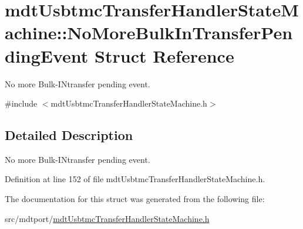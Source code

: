 \hypertarget{structmdt_usbtmc_transfer_handler_state_machine_1_1_no_more_bulk_in_transfer_pending_event}{\section{mdt\-Usbtmc\-Transfer\-Handler\-State\-Machine\-:\-:No\-More\-Bulk\-In\-Transfer\-Pending\-Event Struct Reference}
\label{structmdt_usbtmc_transfer_handler_state_machine_1_1_no_more_bulk_in_transfer_pending_event}
}


No more Bulk-\/\-I\-Ntransfer pending event.  




{\ttfamily \#include $<$mdt\-Usbtmc\-Transfer\-Handler\-State\-Machine.\-h$>$}



\subsection{Detailed Description}
No more Bulk-\/\-I\-Ntransfer pending event. 

Definition at line 152 of file mdt\-Usbtmc\-Transfer\-Handler\-State\-Machine.\-h.



The documentation for this struct was generated from the following file\-:\begin{DoxyCompactItemize}
\item 
src/mdtport/\hyperlink{mdt_usbtmc_transfer_handler_state_machine_8h}{mdt\-Usbtmc\-Transfer\-Handler\-State\-Machine.\-h}\end{DoxyCompactItemize}

